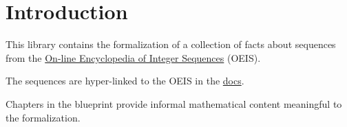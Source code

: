\chapter{Introduction}\label{introduction}

This library contains the formalization of a collection of facts about sequences from 
the \href{https://oeis.org}{On-line Encyclopedia of Integer Sequences} (OEIS).

The sequences are hyper-linked to the OEIS in the 
\href{https://provables.github.io/docs/Sequencelib/Basic.html}{docs}.

Chapters in the blueprint provide informal mathematical content meaningful to the
formalization.

